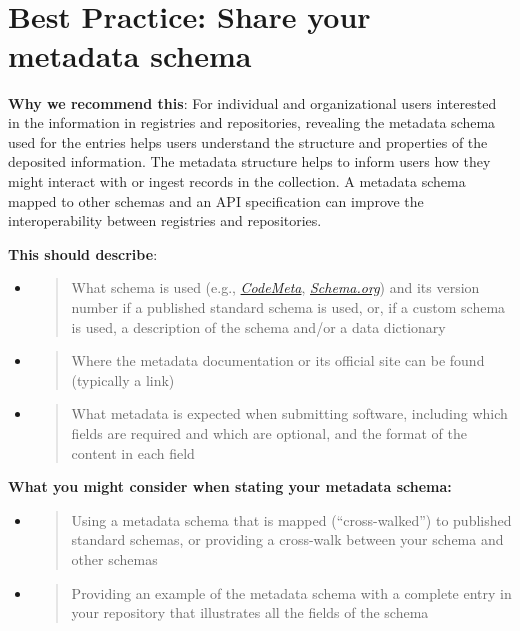 \documentclass[]{article}
\begin{document}
\section{\texorpdfstring{\\
}{ }}\label{section-6}

\newpage
\section{Best Practice: Share your metadata
schema}\label{best-practice-share-your-metadata-schema}

\textbf{Why we recommend this}: For individual and organizational users
interested in the information in registries and repositories, revealing
the metadata schema used for the entries helps users understand the
structure and properties of the deposited information. The metadata
structure helps to inform users how they might interact with or ingest
records in the collection. A metadata schema mapped to other schemas and
an API specification can improve the interoperability between registries
and repositories.

\textbf{This should describe}:

\begin{itemize}
\item
  \begin{quote}
  What schema is used (e.g.,
  \href{https://codemeta.github.io/}{\emph{CodeMeta}},
  \href{https://schema.org/}{\emph{Schema.org}}) and its version number
  if a published standard schema is used, or, if a custom schema is
  used, a description of the schema and/or a data dictionary
  \end{quote}
\item
  \begin{quote}
  Where the metadata documentation or its official site can be found
  (typically a link)
  \end{quote}
\item
  \begin{quote}
  What metadata is expected when submitting software, including which
  fields are required and which are optional, and the format of the
  content in each field
  \end{quote}
\end{itemize}

\textbf{What you might consider when stating your metadata schema:}

\begin{itemize}
\item
  \begin{quote}
  Using a metadata schema that is mapped (``cross-walked'') to published
  standard schemas, or providing a cross-walk between your schema and
  other schemas
  \end{quote}
\item
  \begin{quote}
  Providing an example of the metadata schema with a complete entry in
  your repository that illustrates all the fields of the schema
  \end{quote}
\end{itemize}
\end{document}

